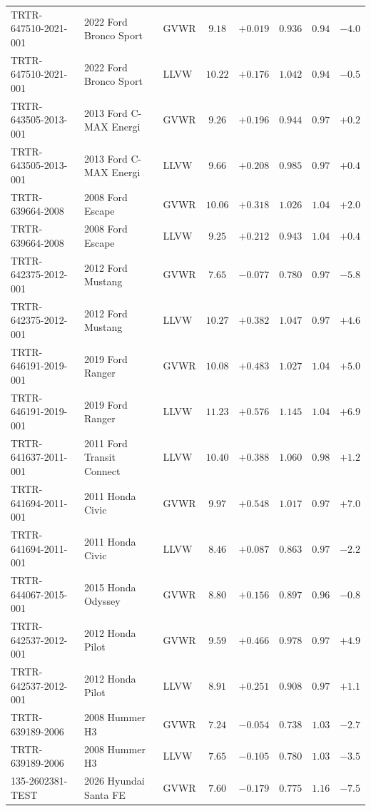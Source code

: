 {\begin{longtable}{lp{2.9cm}lccccc}
TRTR-647510-2021-001 & 2022 Ford Bronco Sport & GVWR & $9.18$ & $+0.019$ & $0.936$ & $0.94$ & $-4.0$\\
TRTR-647510-2021-001 & 2022 Ford Bronco Sport & LLVW & $10.22$ & $+0.176$ & $1.042$ & $0.94$ & $-0.5$\\
TRTR-643505-2013-001 & 2013 Ford C-MAX Energi & GVWR & $9.26$ & $+0.196$ & $0.944$ & $0.97$ & $+0.2$\\
TRTR-643505-2013-001 & 2013 Ford C-MAX Energi & LLVW & $9.66$ & $+0.208$ & $0.985$ & $0.97$ & $+0.4$\\
TRTR-639664-2008 & 2008 Ford Escape & GVWR & $10.06$ & $+0.318$ & $1.026$ & $1.04$ & $+2.0$\\
TRTR-639664-2008 & 2008 Ford Escape & LLVW & $9.25$ & $+0.212$ & $0.943$ & $1.04$ & $+0.4$\\
TRTR-642375-2012-001 & 2012 Ford Mustang & GVWR & $7.65$ & $-0.077$ & $0.780$ & $0.97$ & $-5.8$\\
TRTR-642375-2012-001 & 2012 Ford Mustang & LLVW & $10.27$ & $+0.382$ & $1.047$ & $0.97$ & $+4.6$\\
TRTR-646191-2019-001 & 2019 Ford Ranger & GVWR & $10.08$ & $+0.483$ & $1.027$ & $1.04$ & $+5.0$\\
TRTR-646191-2019-001 & 2019 Ford Ranger & LLVW & $11.23$ & $+0.576$ & $1.145$ & $1.04$ & $+6.9$\\
TRTR-641637-2011-001 & 2011 Ford Transit Connect & LLVW & $10.40$ & $+0.388$ & $1.060$ & $0.98$ & $+1.2$\\
TRTR-641694-2011-001 & 2011 Honda Civic & GVWR & $9.97$ & $+0.548$ & $1.017$ & $0.97$ & $+7.0$\\
TRTR-641694-2011-001 & 2011 Honda Civic & LLVW & $8.46$ & $+0.087$ & $0.863$ & $0.97$ & $-2.2$\\
TRTR-644067-2015-001 & 2015 Honda Odyssey & GVWR & $8.80$ & $+0.156$ & $0.897$ & $0.96$ & $-0.8$\\
TRTR-642537-2012-001 & 2012 Honda Pilot & GVWR & $9.59$ & $+0.466$ & $0.978$ & $0.97$ & $+4.9$\\
TRTR-642537-2012-001 & 2012 Honda Pilot & LLVW & $8.91$ & $+0.251$ & $0.908$ & $0.97$ & $+1.1$\\
TRTR-639189-2006 & 2008 Hummer H3 & GVWR & $7.24$ & $-0.054$ & $0.738$ & $1.03$ & $-2.7$\\
TRTR-639189-2006 & 2008 Hummer H3 & LLVW & $7.65$ & $-0.105$ & $0.780$ & $1.03$ & $-3.5$\\
135-2602381-TEST & 2026 Hyundai Santa FE & GVWR & $7.60$ & $-0.179$ & $0.775$ & $1.16$ & $-7.5$\\

\end{longtable}}
